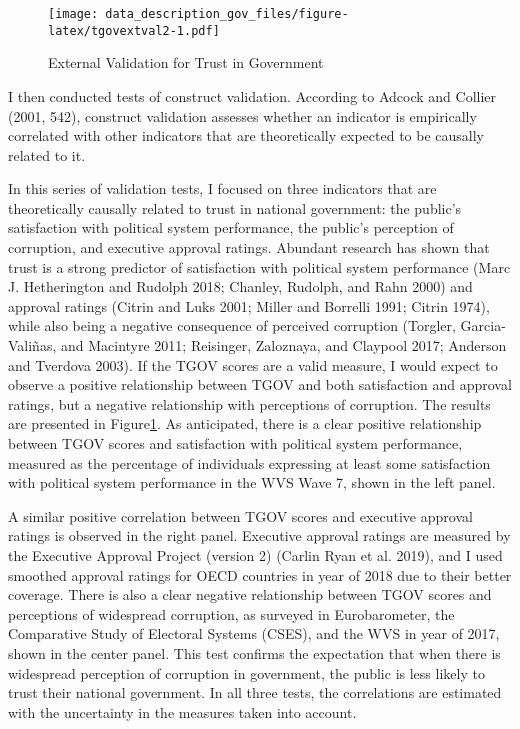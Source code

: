 \documentclass[
  12pt,
]{article}
\begin{document}
\begin{figure}
\centering
\texttt{[image: data\_description\_gov\_files/figure-latex/tgovextval2-1.pdf]}
\caption{\label{fig:tgovextval2}External Validation for Trust in Government \label{tgov_ev2}}
\end{figure}

I then conducted tests of construct validation.
According to Adcock and Collier (2001, 542), construct validation assesses whether an indicator is empirically correlated with other indicators that are theoretically expected to be causally related to it.

In this series of validation tests, I focused on three indicators that are theoretically causally related to trust in national government: the public's satisfaction with political system performance, the public's perception of corruption, and executive approval ratings.
Abundant research has shown that trust is a strong predictor of satisfaction with political system performance (Marc J. Hetherington and Rudolph 2018; Chanley, Rudolph, and Rahn 2000) and approval ratings (Citrin and Luks 2001; Miller and Borrelli 1991; Citrin 1974), while also being a negative consequence of perceived corruption (Torgler, Garcia-Valiñas, and Macintyre 2011; Reisinger, Zaloznaya, and Claypool 2017; Anderson and Tverdova 2003).
If the TGOV scores are a valid measure, I would expect to observe a positive relationship between TGOV and both satisfaction and approval ratings, but a negative relationship with perceptions of corruption.
The results are presented in Figure\nobreakspace{}\ref{tgov_ev2}.
As anticipated, there is a clear positive relationship between TGOV scores and satisfaction with political system performance, measured as the percentage of individuals expressing at least some satisfaction with political system performance in the WVS Wave 7, shown in the left panel.

A similar positive correlation between TGOV scores and executive approval ratings is observed in the right panel.
Executive approval ratings are measured by the Executive Approval Project (version 2) (Carlin Ryan et al. 2019), and I used smoothed approval ratings for OECD countries in year of 2018 due to their better coverage.
There is also a clear negative relationship between TGOV scores and perceptions of widespread corruption, as surveyed in Eurobarometer, the Comparative Study of Electoral Systems (CSES), and the WVS in year of 2017, shown in the center panel.
This test confirms the expectation that when there is widespread perception of corruption in government, the public is less likely to trust their national government.
In all three tests, the correlations are estimated with the uncertainty in the measures taken into account.
\end{document}
